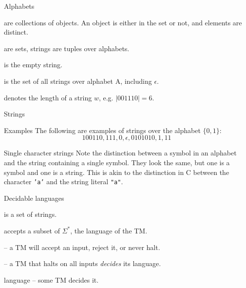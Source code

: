 \begin{frame}{Alphabets}

  \begin{description}[Alphabets]
    \setlength\itemsep{4mm}
    \item[Sets] are collections of objects. An object is either in the set or not, and elements are distinct.
    \item[Alphabets] are sets, strings are tuples over alphabets.
    \item[$\epsilon$] is the empty string.
    \item[$A^*$] is the set of all strings over alphabet A, including $\epsilon$.
    \item[$|w|$] denotes the length of a string $w$, e.g. $|001110|=6$.
  \end{description}
\end{frame}

\begin{frame}{Strings}
  \begin{alertblock}{Examples}
    The following are examples of strings over the alphabet $\{0,1\}$:
    $$100110, 111, 0, \epsilon, 0101010, 1, 11$$
  \end{alertblock}
\begin{alertblock}{Single character strings}
Note the distinction between a symbol in an alphabet and the string containing a single symbol.
They look the same, but one is a symbol and one is a string. 
This is akin to the distinction in C between the character \texttt{'a'} and the string literal \texttt{"a"}.
\end{alertblock}
\end{frame}


\begin{frame}{Decidable languages}
  \begin{description}
    \setlength\itemsep{4mm}
    \item[Language] is a set of strings.
    \item[TM] accepts a subset of $\Sigma^*$, the language of the TM.
    \item[Halting] -- a TM will accept an input, reject it, or never halt.
    \item[Decider] -- a TM that halts on all inputs \emph{decides} its language.
    \item[Decidable] language -- some TM decides it.
  \end{description}
\end{frame}



